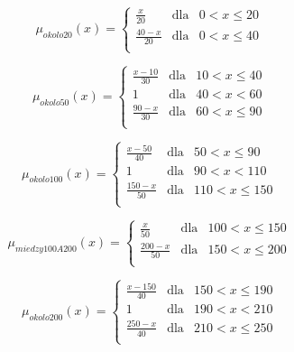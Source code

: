 \documentclass{classrep}
\begin{document}
\begin{equation}
\mu _{okolo20}(x) = \left\{ \begin{array}{rcl}
\frac{x}{20} & \mbox{dla} & 0 < x \leq 20\\
\frac{40 - x}{20} & \mbox{dla} & 0 < x \leq 40\\
\end{array}\right.
\end{equation}

\begin{equation}
\mu _{okolo50}(x) = \left\{ \begin{array}{rcl}
\frac{x - 10}{30} & \mbox{dla} & 10 < x \leq40\\
1 & \mbox{dla} & 40 < x < 60\\
\frac{90 - x}{30} & \mbox{dla} & 60 < x \leq 90\\
\end{array}\right.
\end{equation}

\begin{equation}
\mu _{okolo100}(x) = \left\{ \begin{array}{rcl}
\frac{x - 50}{40} & \mbox{dla} & 50 < x \leq 90\\
1 & \mbox{dla} & 90 < x < 110\\
\frac{150 - x}{50} & \mbox{dla} & 110 < x \leq 150\\
\end{array}\right.
\end{equation}

\begin{equation}
\mu _{miedzy100A200}(x) = \left\{ \begin{array}{rcl}
\frac{x}{50} & \mbox{dla} & 100 < x \leq 150\\
\frac{200- x}{50} & \mbox{dla} & 150 < x \leq 200\\
\end{array}\right.
\end{equation}

\begin{equation}
\mu _{okolo200}(x) = \left\{ \begin{array}{rcl}
\frac{x - 150}{40} & \mbox{dla} & 150 < x \leq 190\\
1 & \mbox{dla} & 190 < x < 210\\
\frac{250 - x}{40} & \mbox{dla} & 210 < x \leq 250\\
\end{array}\right.
\end{equation}
\end{document}
